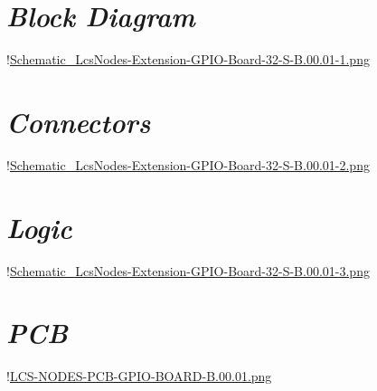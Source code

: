 
\section{\textit{Block Diagram}}

!\href{./Schematics/Schematic_LcsNodes-Extension-GPIO-Board-32-S-B.00.01-1.png }{Schematic_LcsNodes-Extension-GPIO-Board-32-S-B.00.01-1.png}

\section{\textit{Connectors}}

!\href{./Schematics/Schematic_LcsNodes-Extension-GPIO-Board-32-S-B.00.01-2.png }{Schematic_LcsNodes-Extension-GPIO-Board-32-S-B.00.01-2.png}

\section{\textit{Logic}}

!\href{./Schematics/Schematic_LcsNodes-Extension-GPIO-Board-32-S-B.00.01-3.png }{Schematic_LcsNodes-Extension-GPIO-Board-32-S-B.00.01-3.png}

\section{\textit{PCB}}

!\href{./Schematics/LCS-NODES-PCB-GPIO-BOARD-B.00.01.png }{LCS-NODES-PCB-GPIO-BOARD-B.00.01.png}
